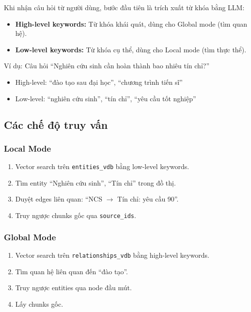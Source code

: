 \documentclass[12pt,a4paper]{article}
\begin{document}
Khi nhận câu hỏi từ người dùng, bước đầu tiên là trích xuất từ khóa bằng LLM:

\begin{itemize}
  \item \textbf{High-level keywords:} Từ khóa khái quát, dùng cho Global mode (tìm quan hệ).
  \item \textbf{Low-level keywords:} Từ khóa cụ thể, dùng cho Local mode (tìm thực thể).
\end{itemize}

Ví dụ: Câu hỏi ``Nghiên cứu sinh cần hoàn thành bao nhiêu tín chỉ?''
\begin{itemize}
  \item High-level: ``đào tạo sau đại học'', ``chương trình tiến sĩ''
  \item Low-level: ``nghiên cứu sinh'', ``tín chỉ'', ``yêu cầu tốt nghiệp''
\end{itemize}

\subsection{Các chế độ truy vấn}

\subsubsection{Local Mode}

\begin{enumerate}
  \item Vector search trên \texttt{entities\_vdb} bằng low-level keywords.
  \item Tìm entity ``Nghiên cứu sinh'', ``Tín chỉ'' trong đồ thị.
  \item Duyệt edges liên quan: ``NCS $\to$ Tín chỉ: yêu cầu 90''.
  \item Truy ngược chunks gốc qua \texttt{source\_ids}.
\end{enumerate}

\subsubsection{Global Mode}

\begin{enumerate}
  \item Vector search trên \texttt{relationships\_vdb} bằng high-level keywords.
  \item Tìm quan hệ liên quan đến ``đào tạo''.
  \item Truy ngược entities qua node đầu mút.
  \item Lấy chunks gốc.
\end{enumerate}
\end{document}
